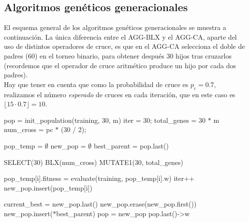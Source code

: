 \documentclass[12pt]{article}
\begin{document}
\subsection*{Algoritmos genéticos generacionales}
\label{agg}

El esquema general de los algoritmos genéticos generacionales se muestra a continuación. La única diferencia entre el AGG-BLX y el AGG-CA, aparte del uso de distintos operadores de cruce, es que en el AGG-CA selecciona el doble de padres (60) en el torneo binario, para obtener después 30 hijos tras cruzarlos (recordemos que el operador de cruce aritmético produce un hijo por cada dos padres).\\

Hay que tener en cuenta que como la probabilidad de cruce es $p_c = 0.7$, realizamos el número \textit{esperado} de cruces en cada iteración, que en este caso es $\lfloor 15 \cdot 0.7 \rfloor = 10$.

\begin{algorithm}[h!]
\begin{algorithmic}

    \State pop = init\_population(training, 30, m) 
    \State iter = 30;
    \State total\_genes = 30 $\ast$ m
    \State num\_cross = pc $\ast$ (30 / 2);  

        \State pop\_temp = $\emptyset$  
        \State new\_pop = $\emptyset$  
        \State best\_parent = pop.last()  

        \State SELECT(30) 
        \State BLX(num\_cross)  
        \State MUTATE1(30, total\_genes)

          
                \State pop\_temp[i].fitness = evaluate(training, pop\_temp[i].w)
                \State iter++
            \EndIf
            \State new\_pop.insert(pop\_temp[i])
        \EndFor
   
        \State current\_best = new\_pop.last()
          
          \State new\_pop.erase(new\_pop.first())
          \State new\_pop.insert($\ast$best\_parent)
        \EndIf
        \State pop = new\_pop 
    \EndWhile
    \State \Return pop.last()->w
\EndFunction
  
\end{algorithmic}
\end{algorithm}
\end{document}
